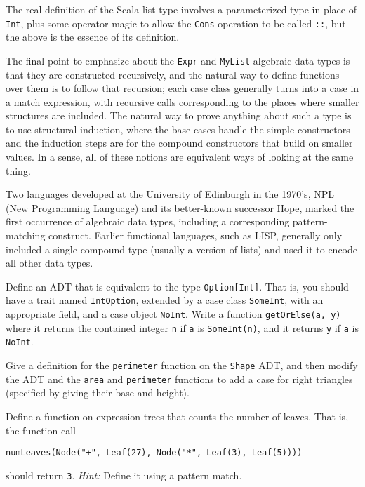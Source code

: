The real definition of the Scala list type involves a parameterized type in place of \texttt{Int}, plus some operator magic to allow the \texttt{Cons} operation to be called \texttt{::}, but the above is the essence of its definition.

The final point to emphasize about the \texttt{Expr} and \texttt{MyList} algebraic data types is that they are constructed recursively, and the natural way to define functions over them is to follow that recursion; each case class generally turns into a case in a match expression, with recursive calls corresponding to the places where smaller structures are included. The natural way to prove anything about such a type is to use structural induction, where the base cases handle the simple constructors and the induction steps are for the compound constructors that build on smaller values. In a sense, all of these notions are equivalent ways of looking at the same thing.

\begin{tailquote}
Two languages developed at the University of Edinburgh in the 1970's, NPL (New Programming Language) and its better-known successor Hope, marked the first occurrence of algebraic data types, including a corresponding pattern-matching construct. Earlier functional languages, such as LISP, generally only included a single compound type (usually a version of lists) and used it to encode all other data types.
\end{tailquote}
\begin{exercises}
\problem Define an ADT that is equivalent to the type \verb|Option[Int]|. That is, you should have a trait named \verb|IntOption|, extended by a case class \verb|SomeInt|, with an appropriate field, and a case object \verb|NoInt|. Write a function \verb|getOrElse(a, y)| where it returns the contained integer \verb|n| if \verb|a| is \verb|SomeInt(n)|, and it returns \verb|y| if \verb|a| is \verb|NoInt|.

\problem Give a definition for the \texttt{perimeter} function on the \texttt{Shape} ADT, and then modify the ADT and the \texttt{area} and \texttt{perimeter} functions to add a case for right triangles (specified by giving their base and height).

\problem Define a function on expression trees that counts the number of leaves. That is, the function call
\begin{verbatim}
numLeaves(Node("+", Leaf(27), Node("*", Leaf(3), Leaf(5))))
\end{verbatim}
should return \texttt{3}. \textit{Hint:} Define it using a pattern match.
\end{exercises}

